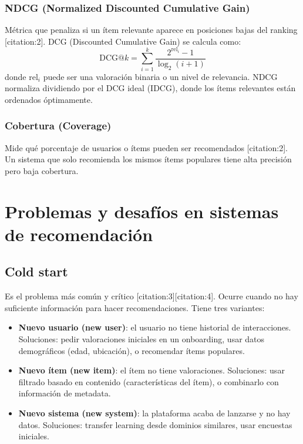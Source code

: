 \documentclass[12pt,a4paper,openany,oneside]{book}
\begin{document}
\subsubsection{NDCG (Normalized Discounted Cumulative Gain)}
Métrica que penaliza si un ítem relevante aparece en posiciones bajas del ranking [citation:2]. DCG (Discounted Cumulative Gain) se calcula como:
\[
\text{DCG}@k = \sum_{i=1}^k \frac{2^{\text{rel}_i} - 1}{\log_2(i+1)}
\]
donde \(\text{rel}_i\) puede ser una valoración binaria o un nivel de relevancia. NDCG normaliza dividiendo por el DCG ideal (IDCG), donde los ítems relevantes están ordenados óptimamente.

\subsubsection{Cobertura (Coverage)}
Mide qué porcentaje de usuarios o ítems pueden ser recomendados [citation:2]. Un sistema que solo recomienda los mismos ítems populares tiene alta precisión pero baja cobertura.

\section{Problemas y desafíos en sistemas de recomendación}

\subsection{Cold start}
Es el problema más común y crítico [citation:3][citation:4]. Ocurre cuando no hay suficiente información para hacer recomendaciones. Tiene tres variantes:

\begin{itemize}
    \item \textbf{Nuevo usuario (new user)}: el usuario no tiene historial de interacciones. Soluciones: pedir valoraciones iniciales en un onboarding, usar datos demográficos (edad, ubicación), o recomendar ítems populares.
    
    \item \textbf{Nuevo ítem (new item)}: el ítem no tiene valoraciones. Soluciones: usar filtrado basado en contenido (características del ítem), o combinarlo con información de metadata.
    
    \item \textbf{Nuevo sistema (new system)}: la plataforma acaba de lanzarse y no hay datos. Soluciones: transfer learning desde dominios similares, usar encuestas iniciales.
\end{itemize}
\end{document}
